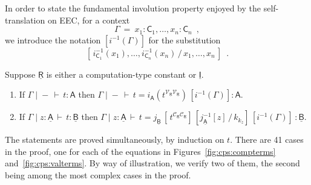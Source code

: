 \documentclass{LMCS}
\newcommand{\comptype}[1]{\underline{#1}}
\newcommand{\VA}{\mathsf{A}}
\newcommand{\VC}{\mathsf{C}}
\newcommand{\CA}{\comptype{\mathsf{A}}}
\newcommand{\CB}{\comptype{\mathsf{B}}}
\newcommand{\CR}{\comptype{\mathsf{R}}}
\newcommand{\CI}{\comptype{\mathsf{I}}}
\newcommand{\In}[2]{#1 \colon  \! #2}
\newcommand{\rIn}[2]{#1 \colon  #2}
\newcommand{\Cj}[4]{#1 \mid  \! #2 \, \vdash \, \rIn{#3}{#4}}
\newcommand{\Vj}[3]{\Cj{#1}{{-}}{#2}{#3}}
\newcommand{\Ceq}[5]{#1 \mid  \! #2 \, \vdash \, #3 = #4 \colon #5}
\newcommand{\Veq}[4]{\Ceq{#1}{-}{#2}{#3}{#4}}
\newcommand{\Vappl}[2]{#1(#2)}
\newcommand{\lappl}[2]{#1[#2]}
\newcommand{\CpsVVT}[1]{#1^{\mathcal{V}_{\CR}\mathcal{V}_{\CR}}}
\newcommand{\CpsCCT}[1]{#1^{\mathcal{C}_{\CR}\mathcal{C}_{\CR}}}
\newcommand{\Viso}[1]{i_{#1}}
\newcommand{\Ciso}[1]{j_{#1}}
\begin{document}
In order to state the fundamental involution property enjoyed
by the self-translation on EEC, for a context
\[
\Gamma \: = \: \In{x_1}{\VC_1}, \dots, \In{x_n}{\VC_n} \enspace ,
\]
we introduce the notation $[\Vappl{\Viso{}^{-1}}{\Gamma}]$ for the substitution
\[
[ \, \Vappl{\Viso{\VC_1}^{-1}}{x_1}, \dots, \Vappl{\Viso{\VC_n}^{-1}}{x_n} \, / \, x_1 , \dots , x_n\,]
\enspace .
\]

\begin{thm}
\label{theorem:involution}
Suppose $\CR$ is either a computation-type constant or $\CI$.
\begin{enumerate}[\em(1)]
\item \label{inv:i}
\label{item:Vnat} If $\Vj{\Gamma}{t}{\VA}$ then
$\Veq{\Gamma}{t}{\Vappl{\Viso{\VA}}{\CpsVVT{t}}\, [\Vappl{\Viso{}^{-1}}{\Gamma}]}{\VA}$.

\item \label{inv:ii} If $\Cj{\Gamma}{\In{z}{\CA}}{t}{\CB}$ then
$\Ceq{\Gamma}{\In{z}{\CA}}{t}
   {\lappl{\Ciso{\CB}\,}{\,\CpsCCT{t}} \, [\lappl{\Ciso{\CA}^{-1}}{z} \, / \, k_{k_z}]\, [\Vappl{\Viso{}^{-1}}{\Gamma}]\,}
     {\CB}$.
\end{enumerate}
\end{thm}
\proof
The statements are proved simultaneously, by induction on $t$. There are 41 cases in the
proof, one for each of the equations in Figures~\ref{fig:cps:compterms} 
and~\ref{fig:cps:valterms}. By way of illustration,
we verify two of them, the second being among the most complex cases in the proof.
\end{document}
